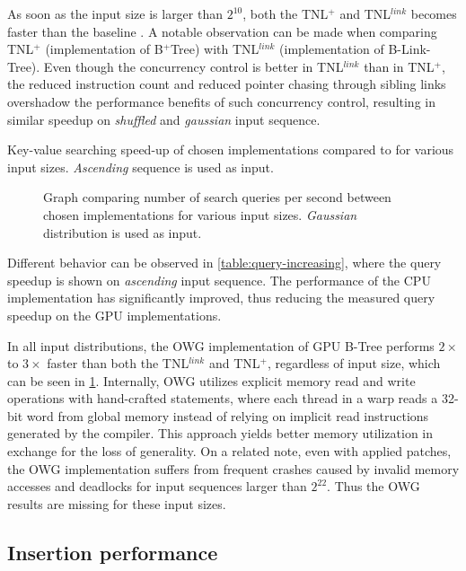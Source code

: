 As soon as the input size is larger than $2^{10}$, both the TNL$^+$ and TNL$^{link}$ becomes faster than the baseline . A notable observation can be made when comparing TNL$^+$ (implementation of B$^+$Tree) with TNL$^{link}$ (implementation of B-Link-Tree). Even though the concurrency control is better in TNL$^{link}$ than in TNL$^+$, the reduced instruction count and reduced pointer chasing through sibling links overshadow the performance benefits of such concurrency control, resulting in similar speedup on \textit{shuffled} and \textit{gaussian} input sequence.

\begin{table}
  \centering
  
  \caption{Key-value searching speed-up of chosen implementations compared to  for various input sizes. \textit{Ascending} sequence is used as input.}
  \label{table:query-increasing}
\end{table}

\begin{figure}
  
  \caption{Graph comparing number of search queries per second between chosen implementations for various input sizes. \textit{Gaussian} distribution is used as input.}
  \label{figure:query-gaussian}
\end{figure}

Different behavior can be observed in \cref{table:query-increasing}, where the query speedup is shown on \textit{ascending} input sequence. The performance of the CPU implementation has significantly improved, thus reducing the measured query speedup on the GPU implementations.

In all input distributions, the OWG implementation of GPU B-Tree performs $2\times$ to $3\times$ faster than both the TNL$^{link}$ and TNL$^+$, regardless of input size, which can be seen in \cref{figure:query-gaussian}. Internally, OWG utilizes explicit memory read and write operations with hand-crafted  statements, where each thread in a warp reads a 32-bit word from global memory instead of relying on implicit read instructions generated by the compiler. This approach yields better memory utilization in exchange for the loss of generality. On a related note, even with applied patches, the OWG implementation suffers from frequent crashes caused by invalid memory accesses and deadlocks for input sequences larger than $2^{22}$. Thus the OWG results are missing for these input sizes.

\subsection{Insertion performance}

